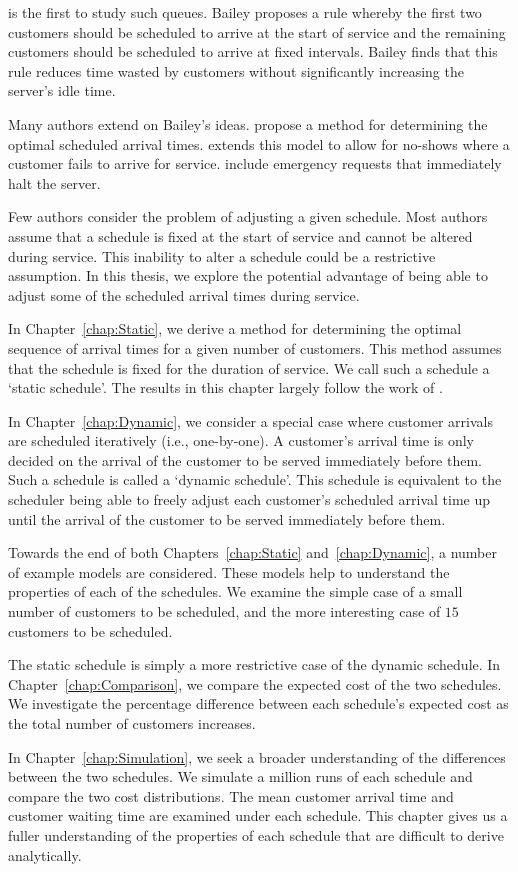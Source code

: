 \citet{Bailey} is the first to study such queues. Bailey proposes a rule whereby the first two customers should be scheduled to arrive at the start of service and the remaining customers should be scheduled to arrive at fixed intervals. Bailey finds that this rule reduces time wasted by customers without significantly increasing the server's idle time.

Many authors extend on Bailey's ideas. \citet{Pegden} propose a method for determining the optimal scheduled arrival times. \citet{Mendel} extends this model to allow for no-shows where a customer fails to arrive for service. \citet{Fiems} include emergency requests that immediately halt the server.

Few authors consider the problem of adjusting a given schedule. Most authors assume that a schedule is fixed at the start of service and cannot be altered during service. This inability to alter a schedule could be a restrictive assumption. In this thesis, we explore the potential advantage of being able to adjust some of the scheduled arrival times during service.

In Chapter~\ref{chap:Static}, we derive a method for determining the optimal sequence of arrival times for a given number of customers. This method assumes that the schedule is fixed for the duration of service. We call such a schedule a `static schedule'. The results in this chapter largely follow the work of \citet{Pegden}.

In Chapter~\ref{chap:Dynamic}, we consider a special case where customer arrivals are scheduled iteratively (i.e., one-by-one). A customer's arrival time is only decided on the arrival of the customer to be served immediately before them. Such a schedule is called a `dynamic schedule'. This schedule is equivalent to the scheduler being able to freely adjust each customer's scheduled arrival time up until the arrival of the customer to be served immediately before them.

Towards the end of both Chapters~\ref{chap:Static} and~\ref{chap:Dynamic}, a number of example models are considered. These models help to understand the properties of each of the schedules. We examine the simple case of a small number of customers to be scheduled, and the more interesting case of $15$ customers to be scheduled.

The static schedule is simply a more restrictive case of the dynamic schedule. In Chapter~\ref{chap:Comparison}, we compare the expected cost of the two schedules. We investigate the percentage difference between each schedule's expected cost as the total number of customers increases.

In Chapter~\ref{chap:Simulation}, we seek a broader understanding of the differences between the two schedules. We simulate a million runs of each schedule and compare the two cost distributions. The mean customer arrival time and customer waiting time are examined under each schedule. This chapter gives us a fuller understanding of the properties of each schedule that are difficult to derive analytically.